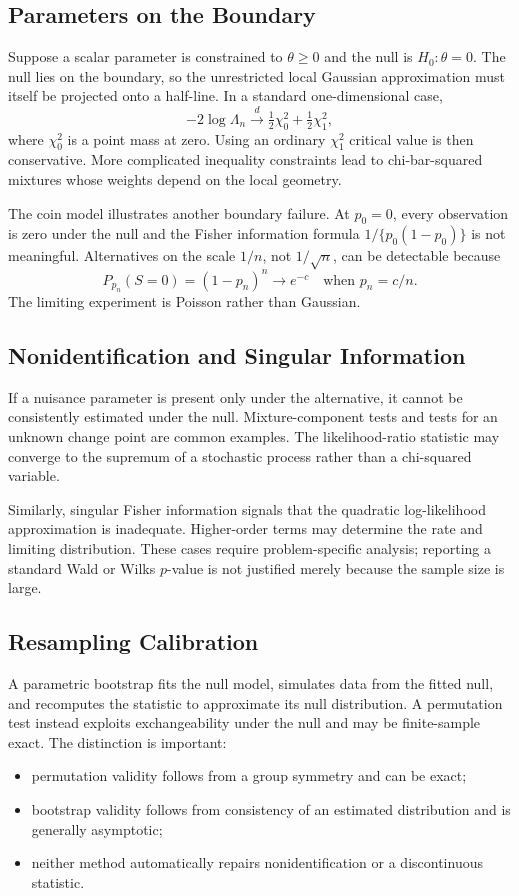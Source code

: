 \documentclass[12pt,oneside]{book}
\numberwithin{equation}{section}
\theoremstyle{definition}
\theoremstyle{plain}
\theoremstyle{remark}
\newcommand{\convd}{\overset{d}{\to}}
\begin{document}
\subsection{Parameters on the Boundary}

Suppose a scalar parameter is constrained to $\theta\geq0$ and the null is
$H_0:\theta=0$.  The null lies on the boundary, so the unrestricted local
Gaussian approximation must itself be projected onto a half-line.  In a
standard one-dimensional case,
\[
    -2\log\Lambda_n
    \convd \tfrac12\chi_0^2+\tfrac12\chi_1^2,
\]
where $\chi_0^2$ is a point mass at zero.  Using an ordinary $\chi_1^2$
critical value is then conservative.  More complicated inequality
constraints lead to chi-bar-squared mixtures whose weights depend on the
local geometry.

The coin model illustrates another boundary failure.  At $p_0=0$, every
observation is zero under the null and the Fisher information formula
$1/\{p_0(1-p_0)\}$ is not meaningful.  Alternatives on the scale $1/n$, not
$1/\sqrt n$, can be detectable because
\[
 P_{p_n}(S=0)=(1-p_n)^n\longrightarrow e^{-c}
 \quad\text{when }p_n=c/n.
\]
The limiting experiment is Poisson rather than Gaussian.

\subsection{Nonidentification and Singular Information}

If a nuisance parameter is present only under the alternative, it cannot be
consistently estimated under the null.  Mixture-component tests and tests for
an unknown change point are common examples.  The likelihood-ratio statistic
may converge to the supremum of a stochastic process rather than a
chi-squared variable.

Similarly, singular Fisher information signals that the quadratic
log-likelihood approximation is inadequate.  Higher-order terms may determine
the rate and limiting distribution.  These cases require problem-specific
analysis; reporting a standard Wald or Wilks $p$-value is not justified merely
because the sample size is large.

\subsection{Resampling Calibration}

A parametric bootstrap fits the null model, simulates data from the fitted
null, and recomputes the statistic to approximate its null distribution.  A
permutation test instead exploits exchangeability under the null and may be
finite-sample exact.  The distinction is important:
\begin{itemize}
    \item permutation validity follows from a group symmetry and can be exact;
    \item bootstrap validity follows from consistency of an estimated
    distribution and is generally asymptotic;
    \item neither method automatically repairs nonidentification or a
    discontinuous statistic.
\end{itemize}
\end{document}
